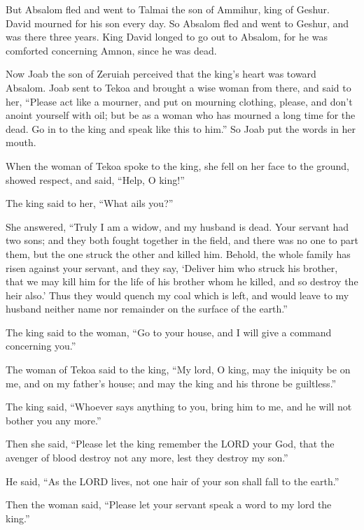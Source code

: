 \myverse{}But Absalom fled and went to Talmai the son of Ammihur, king
of Geshur. David mourned for his son every day.
\myverse{}So Absalom fled and went to Geshur, and was there three years.
\myverse{}King David longed to go out to Absalom, for he was comforted concerning Amnon,
since he was dead.


\mychapter{} \myverse*{}Now Joab the son of Zeruiah perceived that the king’s heart was
toward Absalom.
\myverse{}Joab sent to Tekoa and brought a wise woman from there, and said to her, “Please
act like a mourner, and put on mourning clothing, please, and don’t anoint yourself with oil; but be as
a woman who has mourned a long time for the dead.
\myverse{}Go in to the king and speak like this to him.” So Joab put the words in her
mouth.

\myverse{}When the woman of Tekoa spoke to the king, she fell on her face
to the ground, showed respect, and said, “Help, O king!”

\myverse{}The king said to her, “What ails you?”

She answered, “Truly I am a widow, and my husband is dead.
\myverse{}Your servant had two sons; and they both fought together in the field, and
there was no one to part them, but the one struck the other and killed him.
\myverse{}Behold, the whole family has risen against your servant, and they say, ‘Deliver
him who struck his brother, that we may kill him for the life of his brother whom he killed, and so destroy
the heir also.’ Thus they would quench my coal which is left, and would leave to my husband neither name
nor remainder on the surface of the earth.”

\myverse{}The king said to the woman, “Go to your house, and I will give
a command concerning you.”

\myverse{}The woman of Tekoa said to the king, “My lord, O king, may the
iniquity be on me, and on my father’s house; and may the king and his throne be guiltless.”

\myverse{}The king said, “Whoever says anything to you, bring him to me,
and he will not bother you any more.”

\myverse{}Then she said, “Please let the king remember the LORD your God,
that the avenger of blood destroy not any more, lest they destroy my son.”

He said, “As the LORD lives, not one hair of your son shall fall to the earth.”

\myverse{}Then the woman said, “Please let your servant speak a word to
my lord the king.”

